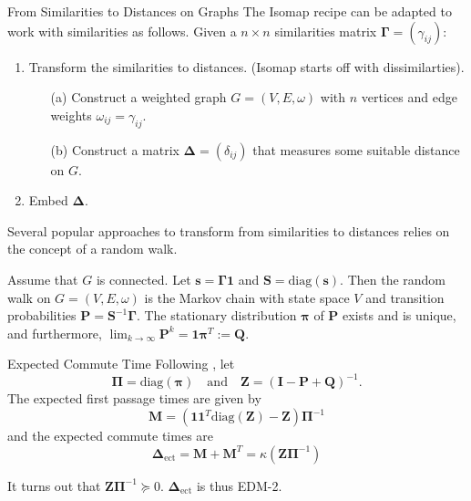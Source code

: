 \documentclass[professionalfonts, hyperref={pdfpagelabels=false,
  colorlinks=true, linkcolor=purple}]{beamer}
\begin{document}
\begin{frame}{From Similarities to Distances on Graphs}
 The Isomap recipe can be adapted to work with similarities as
  follows.
  \vskip10pt Given a $n \times n$ similarities matrix $\bm{\Gamma} = (\gamma_{ij})$:
  \begin{enumerate}
  \item Transform the similarities to distances. (Isomap
    starts off with dissimilarties).
    \begin{enumerate}
    \item[(a)]Construct a weighted graph $G = (V,E,\omega)$ with $n$
      vertices and edge weights $\omega_{ij} = \gamma_{ij}$.
    \item[(b)] Construct a matrix $\bm{\Delta} = (\delta_{ij})$
      that measures some suitable distance on $G$. 
    \end{enumerate}
  \item Embed $\bm{\Delta}$. 
  \end{enumerate}
  Several popular approaches to transform from similarities to
   distances relies on the concept of a \alert{random walk}.
    
    \vskip10pt Assume that $G$ is connected. Let $\bm{s} =
    \bm{\Gamma}\bm{1}$ and $\mathbf{S} = \mathrm{diag}(\bm{s})$. Then
    the random walk on $G = (V,E,\omega)$ is the Markov chain with
    state space $V$ and transition probabilities $\mathbf{P} =
    \mathbf{S}^{-1}\bm{\Gamma}$. The stationary distribution
    $\bm{\pi}$ of $\mathbf{P}$ exists and is unique, and furthermore,
    $\lim_{k \rightarrow \infty} \mathbf{P}^{k} = \bm{1}\bm{\pi}^{T}
    := \mathbf{Q}$.
\end{frame}

\begin{frame}{Expected Commute Time}
  Following \cite{kemeny83:_finit_markov_chain}, let
  \begin{equation*}
    \bm{\Pi} = \mathrm{diag}(\bm{\pi}) \quad \text{and} \quad
    \mathbf{Z} = (\mathbf{I} - \mathbf{P} + \mathbf{Q})^{-1}.
  \end{equation*}
  The expected first passage times are given by
  \begin{equation*}
    \mathbf{M} = (\mathbf{1}\mathbf{1}^{T}\mathrm{diag}(\mathbf{Z}) -
    \mathbf{Z})\bm{\Pi}^{-1} 
  \end{equation*}
  and the expected commute times are
  \begin{equation*}
    \bm{\Delta}_{\mathrm{ect}} = \mathbf{M} + \mathbf{M}^{T} =
    \kappa(\mathbf{Z}\bm{\Pi}^{-1})
  \end{equation*}

 It turns out that $\mathbf{Z}\bm{\Pi}^{-1} \succeq
  0$. $\bm{\Delta}_{\mathrm{ect}}$ is thus \alert{EDM-2}.
\end{frame}
\end{document}
